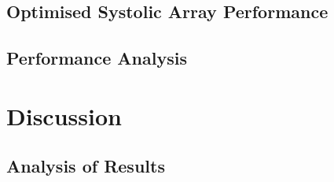 \documentclass[12pt, a4paper, ukenglish]{article}
\begin{document}
    \subsection{Optimised Systolic Array Performance} \label{sec: perform optimised}

    \subsection{Performance Analysis}\label{sec: per analysis}


\section{Discussion} \label{sec: discussion}
    \subsection{Analysis of Results} \label{sec: analysis}
    
\end{document}
